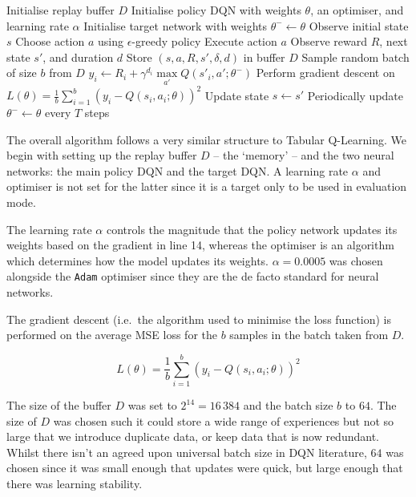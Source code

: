 \documentclass[a4paper]{report}
\begin{document}
\begin{algorithm}[H]
  \caption{Deep Q-Learning}
  \begin{algorithmic}[1]
  \State Initialise replay buffer $D$
  \State Initialise policy DQN with weights $\theta$, an optimiser, and learning rate $\alpha$
  \State Initialise target network with weights $\theta^- \leftarrow \theta$
    \State Observe initial state $s$
      \State Choose action $a$ using $\epsilon$-greedy policy
      \State Execute action $a$
      \State Observe reward $R$, next state $s'$, and duration $d$
      \State Store $(s,a,R,s',\delta,d)$ in buffer $D$
      \State Sample random batch of size $b$ from $D$
        \State $y_i \leftarrow R_i + \gamma^{d_i} \underset{a'}\max Q(s'_i,a';\theta^-)$
      \EndFor
      \State Perform gradient descent on $L(\theta) = \frac{1}{b} \sum_{i=1}^{b} \left(y_i - Q(s_i, a_i; \theta)\right)^2$
      \State Update state $s \leftarrow s'$
      \State Periodically update $\theta^- \leftarrow \theta$ every $T$ steps
    \EndFor
  \EndFor
  \end{algorithmic}
\end{algorithm}

The overall algorithm follows a very similar structure to Tabular Q-Learning. We begin with setting up the replay buffer $D$ -- the `memory' -- and the two neural networks: the main policy DQN and the target DQN. A learning rate $\alpha$ and optimiser is not set for the latter since it is a target only to be used in evaluation mode.

The learning rate $\alpha$ controls the magnitude that the policy network updates its weights based on the gradient in line 14, whereas the optimiser is an algorithm which determines how the model updates its weights. $\alpha=0.0005$ was chosen alongside the \texttt{Adam} optimiser since they are the de facto standard for neural networks.

The gradient descent (i.e.\ the algorithm used to minimise the loss function) is performed on the average MSE loss for the $b$ samples in the batch taken from $D$.

$$L(\theta) = \frac{1}{b} \sum_{i=1}^{b} \left(y_i - Q(s_i, a_i; \theta)\right)^2$$

The size of the buffer $D$ was set to $2^{14}=16\,384$ and the batch size $b$ to $64$. The size of $D$ was chosen such it could store a wide range of experiences but not so large that we introduce duplicate data, or keep data that is now redundant. Whilst there isn't an agreed upon universal batch size in DQN literature, $64$ was chosen since it was small enough that updates were quick, but large enough that there was learning stability.
\end{document}
